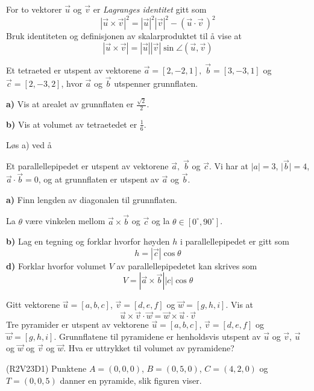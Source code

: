 For to vektorer $ \vec{u} $ og $ \vec{v} $ er \textit{Lagranges identitet} gitt som
\[ |\vec{u}\times\vec{v}|^2=|\vec{u}|^2|\vec{v}|^2-(\vec{u}\cdot\vec{v}\,)^2 \]
Bruk identiteten og definisjonen av skalarproduktet til å vise at
\[ |\vec{u}\times\vec{v}|=|\vec{u}||\vec{v}|\sin \angle(\vec{u}, \vec{v})  \]\vs

Et tetraeted er utspent av vektorene $ \vec{a}=[2, -2, 1],\; \vec{b}=[3, -3, 1] $ og $ \vec{c}=[2, -3, 2] $, hvor $ \vec{a} $ og $ \vec{b} $ utspenner grunnflaten.\os

\textbf{a)} Vis at arealet av grunnflaten er $ \frac{\sqrt{2}}{2} $.\os

\textbf{b)} Vis at volumet av tetraetedet er $ \frac{1}{6} $.
\newpage

Løs  a) ved å

Et parallellepipedet er utspent av vektorene $ \vec{a},\; \vec{b} $ og $ \vec{c} $. Vi har at ${|a|=3}$,  $|{\vec{b}|=4}$, $ {\vec{a}\cdot \vec{b}=0}  $, og at grunnflaten er utspent av $ \vec{a} $ og $ \vec{b} $. \os

\textbf{a)} Finn lengden av diagonalen til grunnflaten.\os

La $ \theta $ være vinkelen mellom $ {\vec{a}\times\vec{b}} $ og $ \vec{c} $ og la $ {\theta\in[0^\circ, 90^\circ]} $.\os

\textbf{b)} Lag en tegning og forklar hvorfor høyden $ h $ i parallellepipedet er gitt som
\[ h= |\vec{c}|\cos \theta \]
\textbf{d)} Forklar hvorfor volumet $ V $ av parallellepipedetet kan skrives som
\[ V= |\vec{a}\times\vec{b}||c|\cos \theta\]\vs

Gitt vektorene $ \vec{u}=[a, b, c] $, $ \vec{v}=[d, e, f] $ og $ \vec{w}=[g, h, i] $. Vis at
\[ \vec{u}\times\vec{v}\cdot\vec{w}= \vec{w}\times\vec{u}\cdot\vec{v}\]
Tre pyramider er utspent av vektorene $ \vec{u}=[a, b, c] $, $ \vec{v}=[d, e, f] $ og $ \vec{w}=[g, h, i] $. Grunnflatene til pyramidene er henholdsvis utspent av $ \vec{u} $ og $ \vec{v} $, $ \vec{u} $ og $ \vec{w} $ og $ \vec{v} $ og $ \vec{w} $. Hva er uttrykket til volumet av pyramidene?

\newpage
{}
(R2V23D1)\os
Punktene $ A=(0,0,0) $, $ B=(0,5,0) $, $ C=(4,2,0) $ og $ T=(0,0,5) $ danner en pyramide, slik figuren viser.

